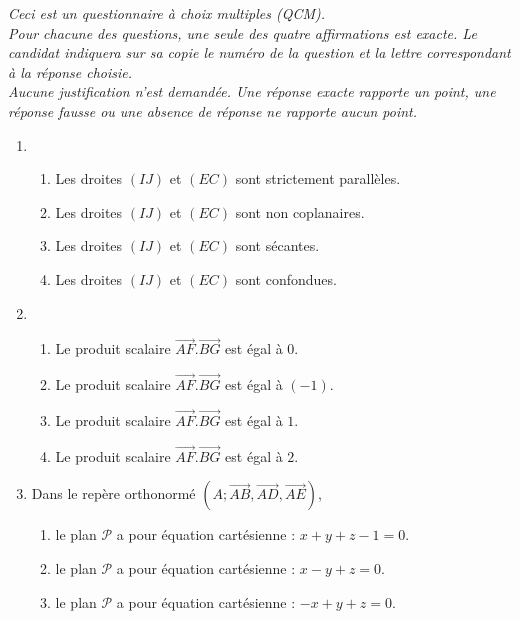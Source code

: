 \textit{Ceci est un questionnaire à choix multiples (QCM). 
\\Pour chacune des questions, une seule des quatre affirmations est exacte. Le candidat indiquera sur sa copie le numéro de la question et la lettre correspondant à la réponse choisie. 
\\Aucune justification n'est demandée. Une réponse exacte rapporte un point, une réponse fausse ou une absence de réponse ne rapporte aucun point.}
\begin{enumerate}
     \item
     \begin{enumerate}
          \item
          Les droites $\left(IJ\right)$ et $\left(EC\right)$ sont strictement parallèles.
          \item
          Les droites $\left(IJ\right)$ et $\left(EC\right)$ sont non coplanaires.
          \item
          Les droites $\left(IJ\right)$ et $\left(EC\right)$ sont sécantes.
          \item
     Les droites $\left(IJ\right)$ et $\left(EC\right)$ sont confondues.\end{enumerate}
     \item
     \begin{enumerate}
          \item
          Le produit scalaire $\overrightarrow{AF}.\overrightarrow{BG}$ est égal à $0$.
          \item
          Le produit scalaire $\overrightarrow{AF}.\overrightarrow{BG}$ est égal à $\left(-1\right)$.
          \item
          Le produit scalaire $\overrightarrow{AF}.\overrightarrow{BG}$ est égal à $1$.
          \item
     Le produit scalaire $\overrightarrow{AF}.\overrightarrow{BG}$ est égal à $2$.\end{enumerate}
     \item
     Dans le repère orthonormé $\left(A ;  \overrightarrow{AB}, \overrightarrow{AD}, \overrightarrow{AE}\right)$,
     \begin{enumerate}
          \item
          le plan $\mathscr P$ a pour équation cartésienne : $x+y+z-1=0$.
          \item
          le plan $\mathscr P$ a pour équation cartésienne : $x-y+z=0$.
          \item
          le plan $\mathscr P$ a pour équation cartésienne : $-x+y+z=0$.

\end{enumerate}
\end{enumerate}
